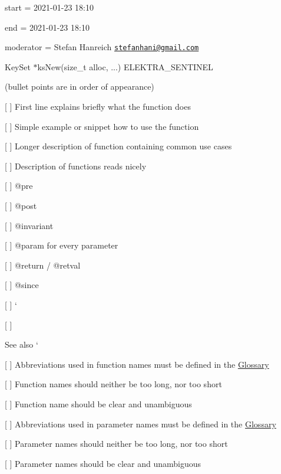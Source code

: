 
\begin{DoxyItemize}
\item start = 2021-\/01-\/23 18\+:10
\item end = 2021-\/01-\/23 18\+:10
\item moderator = Stefan Hanreich \href{mailto:stefanhani@gmail.com}{\tt stefanhani@gmail.\+com}
\end{DoxyItemize}

{\ttfamily Key\+Set $\ast$ks\+New(size\+\_\+t alloc, ...) E\+L\+E\+K\+T\+R\+A\+\_\+\+S\+E\+N\+T\+I\+N\+EL}

(bullet points are in order of appearance)


\begin{DoxyItemize}
\item \mbox{[} \mbox{]} First line explains briefly what the function does
\item \mbox{[} \mbox{]} Simple example or snippet how to use the function
\item \mbox{[} \mbox{]} Longer description of function containing common use cases
\item \mbox{[} \mbox{]} Description of functions reads nicely
\item \mbox{[} \mbox{]} {\ttfamily @pre}
\item \mbox{[} \mbox{]} {\ttfamily @post}
\item \mbox{[} \mbox{]} {\ttfamily @invariant}
\item \mbox{[} \mbox{]} {\ttfamily @param} for every parameter
\item \mbox{[} \mbox{]} {\ttfamily @return} / {\ttfamily @retval}
\item \mbox{[} \mbox{]} {\ttfamily @since}
\item \mbox{[} \mbox{]} `{\ttfamily }
\item {\ttfamily \mbox{[} \mbox{]}}\begin{DoxySeeAlso}{See also}
`
\end{DoxySeeAlso}

\end{DoxyItemize}


\begin{DoxyItemize}
\item \mbox{[} \mbox{]} Abbreviations used in function names must be defined in the \hyperlink{doc_help_elektra-glossary_md}{Glossary}
\item \mbox{[} \mbox{]} Function names should neither be too long, nor too short
\item \mbox{[} \mbox{]} Function name should be clear and unambiguous
\item \mbox{[} \mbox{]} Abbreviations used in parameter names must be defined in the \hyperlink{doc_help_elektra-glossary_md}{Glossary}
\item \mbox{[} \mbox{]} Parameter names should neither be too long, nor too short
\item \mbox{[} \mbox{]} Parameter names should be clear and unambiguous
\end{DoxyItemize}


